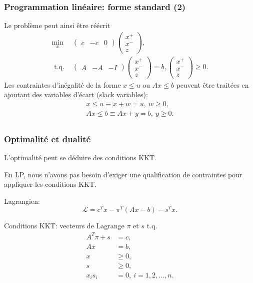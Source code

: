 \begin{frame}
\frametitle{Programmation linéaire: forme standard (2)}

Le problème peut ainsi être réécrit
\begin{align*}
\min_x\ &
\begin{pmatrix}
c & -c & 0
\end{pmatrix}
\begin{pmatrix}
x^+ \\ x^- \\ z
\end{pmatrix}, \\
\mbox{ t.q. } &
\begin{pmatrix}
A & -A & -I
\end{pmatrix}
\begin{pmatrix}
x^+ \\ x^- \\ z
\end{pmatrix} = b,
\begin{pmatrix}
x^+ \\ x^- \\ z
\end{pmatrix} \geq 0.
\end{align*}
Les contraintes d'inégalité de la forme $x \leq u$ ou $Ax \leq b$
peuvent être traitées en ajoutant des variables d'écart (slack
variables):
\begin{align*}
x \leq u \equiv x+w = u,\ w \geq 0, \\
Ax \leq b \equiv Ax + y = b,\ y \geq 0. \\
\end{align*}

\end{frame}

\begin{frame}
\frametitle{Optimalité et dualité}

L'optimalité peut se déduire des conditions KKT.

\mbox{}

En LP, nous n'avons pas besoin d'exiger une qualification de
contraintes pour appliquer les conditions KKT.

\mbox{}

Lagrangien:
\[
\mathcal{L} = c^Tx - \pi^T(Ax-b) - s^Tx.
\]

Conditions KKT: vecteurs de Lagrange $\pi$ et $s$ t.q.
\begin{align*}
A^T\pi + s &= c,\\
Ax &= b,\\
x &\geq 0,\\
s &\geq 0,\\
x_is_i &= 0,\ i=1,2,\ldots,n.
\end{align*}

\end{frame}

